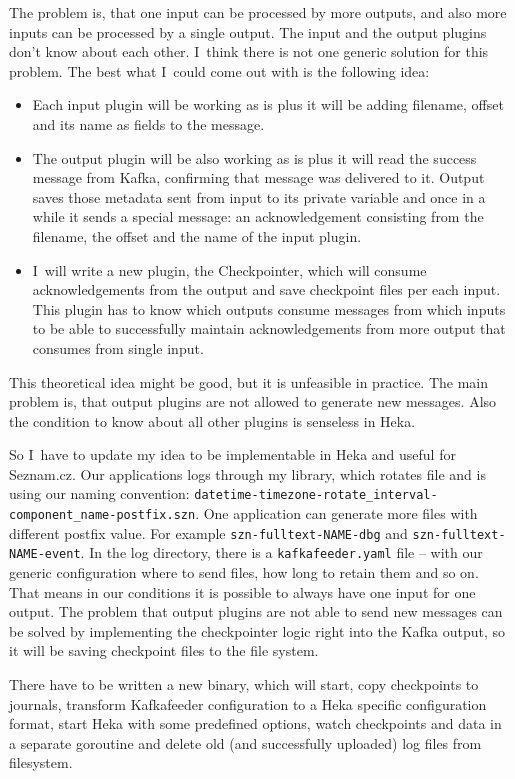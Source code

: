 The problem is, that one input can be processed by more outputs, and also more inputs can be processed by a single output. The input and the output plugins don’t know about each other. I~think there is not one generic solution for this problem. The best what I~could come out with is the following idea:

\begin{itemize}
  \item Each input plugin will be working as is plus it will be adding filename, offset and its name as fields to the message. 
  \item The output plugin will be also working as is plus it will read the success message from Kafka, confirming that message was delivered to it. Output saves those metadata sent from input to its private variable and once in a while it sends a special message: an acknowledgement consisting from the filename, the offset and the name of the input plugin.
  \item I~will write a new plugin, the Checkpointer, which will consume acknowledgements from the output and save checkpoint files per each input. This plugin has to know which outputs consume messages from which inputs to be able to successfully maintain acknowledgements from more output that consumes from single input.
\end{itemize}

This theoretical idea might be good, but it is unfeasible in practice. The main problem is, that output plugins are not allowed to generate new messages. Also the condition to know about all other plugins is senseless in Heka.

So I~have to update my idea to be implementable in Heka and useful for Seznam.cz. Our applications logs through my library, which rotates file and is using our naming convention: \lstinline{datetime-timezone-rotate_interval-component_name-postfix.szn}. One application can generate more files with different postfix value. For example \lstinline{szn-fulltext-NAME-dbg} and \lstinline{szn-fulltext-NAME-event}. In the log directory, there is a \lstinline{kafkafeeder.yaml} file -- with our generic configuration where to send files, how long to retain them and so on. That means in our conditions it is possible to always have one input for one output. The problem that output plugins are not able to send new messages can be solved by implementing the checkpointer logic right into the Kafka output, so it will be saving checkpoint files to the file system.

There have to be written a new binary, which will start, copy checkpoints to journals, transform Kafkafeeder configuration to a Heka specific configuration format, start Heka with some predefined options, watch checkpoints and data in a separate goroutine and delete old (and successfully uploaded) log files from filesystem.

